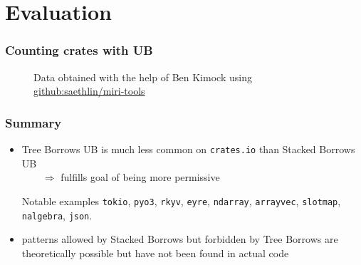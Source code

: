 \section{Evaluation}

\begin{frame}
    \frametitle{Counting crates with UB}
    \begin{figure}
        {\footnotesize Data obtained with the help of Ben Kimock using
        \href{https://github.com/saethlin/miri-tools}{github:saethlin/miri-tools}}
    \end{figure}
\end{frame}

\begin{frame}
    \frametitle{Summary}
    \begin{itemize}
        \item Tree Borrows UB is much less common on \texttt{crates.io} than Stacked Borrows UB\\
            \(\qquad\Rightarrow\) fulfills goal of being more permissive
            \begin{block}{Notable examples}
                \texttt{tokio}, \texttt{pyo3}, \texttt{rkyv}, \texttt{eyre}, \texttt{ndarray},
                \texttt{arrayvec}, \texttt{slotmap}, \texttt{nalgebra}, \texttt{json}.
            \end{block}
        \item patterns allowed by Stacked Borrows but forbidden by Tree Borrows are theoretically
            possible but have not been found in actual code
    \end{itemize}
\end{frame}

